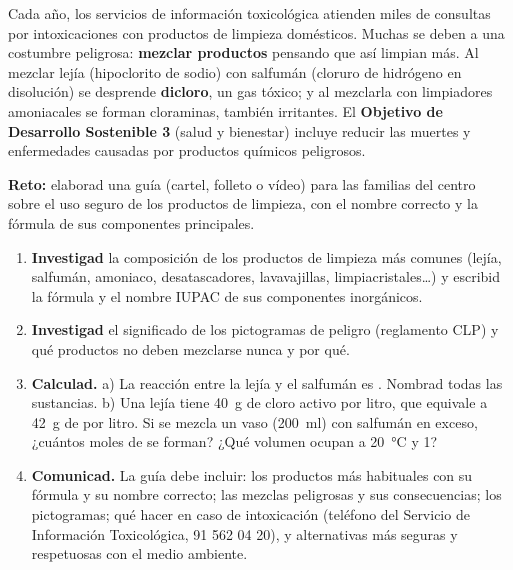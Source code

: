 Cada año, los servicios de información toxicológica atienden miles de consultas por intoxicaciones con productos de limpieza
domésticos. Muchas se deben a una costumbre peligrosa: \textbf{mezclar productos} pensando que así limpian más. Al mezclar lejía
(hipoclorito de sodio) con salfumán (cloruro de hidrógeno en disolución) se desprende \textbf{dicloro}, un gas tóxico; y al
mezclarla con limpiadores amoniacales se forman cloraminas, también irritantes. El \textbf{Objetivo de Desarrollo Sostenible 3}
(salud y bienestar) incluye reducir las muertes y enfermedades causadas por productos químicos peligrosos.

\begin{marker}
    \textbf{Reto:} elaborad una guía (cartel, folleto o vídeo) para las familias del centro sobre el uso seguro de los productos
    de limpieza, con el nombre correcto y la fórmula de sus componentes principales.
\end{marker}

\begin{enumerate}[label=\numberballred]
    \item \textbf{Investigad} la composición de los productos de limpieza más comunes (lejía, salfumán, amoniaco, desatascadores,
    lavavajillas, limpiacristales\dots) y escribid la fórmula y el nombre IUPAC de sus componentes inorgánicos.
    \item \textbf{Investigad} el significado de los pictogramas de peligro (reglamento CLP) y qué productos no deben mezclarse
    nunca y por qué.
    \item \textbf{Calculad.} a) La reacción entre la lejía y el salfumán es
    . Nombrad todas las sustancias. b) Una lejía tiene \qty{40}{\gram} de cloro activo por
    litro, que equivale a \qty{42}{\gram} de  por litro. Si se mezcla un vaso (\qty{200}{\milli\litre}) con salfumán
    en exceso, ¿cuántos moles de  se forman? ¿Qué volumen ocupan a \qty{20}{\degreeCelsius} y \qty{1}{\atm}?
    \item \textbf{Comunicad.} La guía debe incluir: los productos más habituales con su fórmula y su nombre correcto; las mezclas
    peligrosas y sus consecuencias; los pictogramas; qué hacer en caso de intoxicación (teléfono del Servicio de Información
    Toxicológica, 91 562 04 20), y alternativas más seguras y respetuosas con el medio ambiente.
\end{enumerate}

